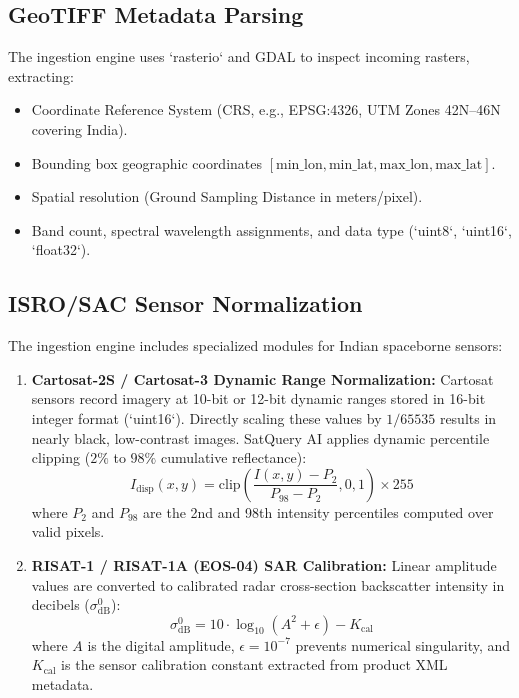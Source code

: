 \documentclass[12pt,a4paper]{report}
\begin{document}
\subsection{GeoTIFF Metadata Parsing}
The ingestion engine uses `rasterio` and GDAL to inspect incoming rasters, extracting:
\begin{itemize}
    \item Coordinate Reference System (CRS, e.g., EPSG:4326, UTM Zones 42N--46N covering India).
    \item Bounding box geographic coordinates $[\text{min\_lon}, \text{min\_lat}, \text{max\_lon}, \text{max\_lat}]$.
    \item Spatial resolution (Ground Sampling Distance in meters/pixel).
    \item Band count, spectral wavelength assignments, and data type (`uint8`, `uint16`, `float32`).
\end{itemize}

\subsection{ISRO/SAC Sensor Normalization}
The ingestion engine includes specialized modules for Indian spaceborne sensors:
\begin{enumerate}
    \item \textbf{Cartosat-2S / Cartosat-3 Dynamic Range Normalization:} Cartosat sensors record imagery at 10-bit or 12-bit dynamic ranges stored in 16-bit integer format (`uint16`). Directly scaling these values by $1/65535$ results in nearly black, low-contrast images. SatQuery AI applies dynamic percentile clipping ($2\%$ to $98\%$ cumulative reflectance):
    \begin{equation}
        I_{\text{disp}}(x, y) = \text{clip}\left(\frac{I(x,y) - P_2}{P_{98} - P_2}, 0, 1\right) \times 255
    \end{equation}
    where $P_2$ and $P_{98}$ are the 2nd and 98th intensity percentiles computed over valid pixels.
    \item \textbf{RISAT-1 / RISAT-1A (EOS-04) SAR Calibration:} Linear amplitude values are converted to calibrated radar cross-section backscatter intensity in decibels ($\sigma^0_{\text{dB}}$):
    \begin{equation}
        \sigma^0_{\text{dB}} = 10 \cdot \log_{10}(A^2 + \epsilon) - K_{\text{cal}}
    \end{equation}
    where $A$ is the digital amplitude, $\epsilon = 10^{-7}$ prevents numerical singularity, and $K_{\text{cal}}$ is the sensor calibration constant extracted from product XML metadata.
\end{enumerate}
\end{document}
